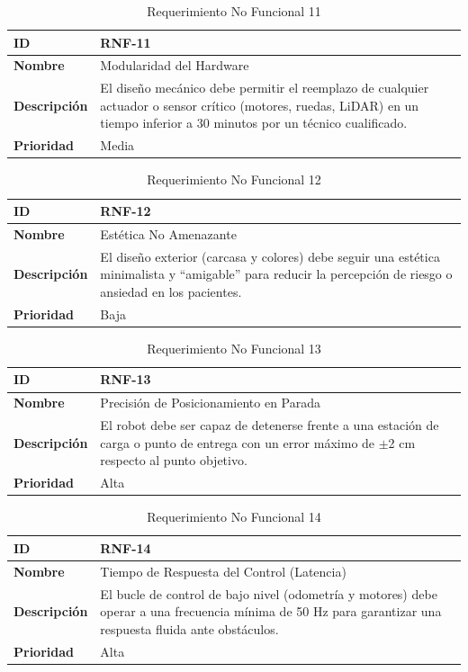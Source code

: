\begin{table}[H]
\centering
\begin{tabular}{|l|p{10cm}|}
\hline
\textbf{ID} & RNF-11 \\ \hline
\textbf{Nombre} & Modularidad del Hardware \\ \hline
\textbf{Descripción} & El diseño mecánico debe permitir el reemplazo de cualquier actuador o sensor crítico (motores, ruedas, LiDAR) en un tiempo inferior a 30 minutos por un técnico cualificado. \\ \hline
\textbf{Prioridad} & Media \\ \hline
\end{tabular}
\caption{Requerimiento No Funcional 11}
\end{table}

\begin{table}[H]
\centering
\begin{tabular}{|l|p{10cm}|}
\hline
\textbf{ID} & RNF-12 \\ \hline
\textbf{Nombre} & Estética No Amenazante \\ \hline
\textbf{Descripción} & El diseño exterior (carcasa y colores) debe seguir una estética minimalista y ``amigable'' para reducir la percepción de riesgo o ansiedad en los pacientes. \\ \hline
\textbf{Prioridad} & Baja \\ \hline
\end{tabular}
\caption{Requerimiento No Funcional 12}
\end{table}

\begin{table}[H]
\centering
\begin{tabular}{|l|p{10cm}|}
\hline
\textbf{ID} & RNF-13 \\ \hline
\textbf{Nombre} & Precisión de Posicionamiento en Parada \\ \hline
\textbf{Descripción} & El robot debe ser capaz de detenerse frente a una estación de carga o punto de entrega con un error máximo de $\pm$2 cm respecto al punto objetivo. \\ \hline
\textbf{Prioridad} & Alta \\ \hline
\end{tabular}
\caption{Requerimiento No Funcional 13}
\end{table}

\begin{table}[H]
\centering
\begin{tabular}{|l|p{10cm}|}
\hline
\textbf{ID} & RNF-14 \\ \hline
\textbf{Nombre} & Tiempo de Respuesta del Control (Latencia) \\ \hline
\textbf{Descripción} & El bucle de control de bajo nivel (odometría y motores) debe operar a una frecuencia mínima de 50 Hz para garantizar una respuesta fluida ante obstáculos. \\ \hline
\textbf{Prioridad} & Alta \\ \hline
\end{tabular}
\caption{Requerimiento No Funcional 14}
\end{table}

